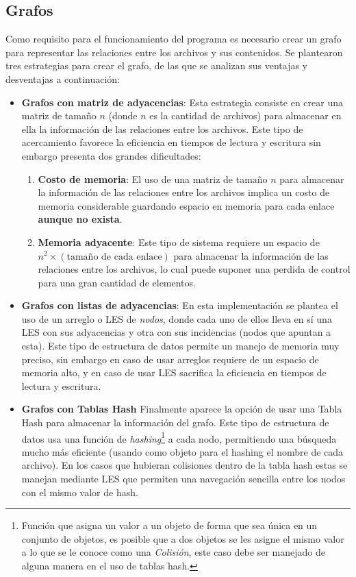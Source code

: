 \subsection{Grafos}
Como requisito para el funcionamiento del programa es necesario crear un grafo para representar las relaciones entre los archivos y sus contenidos. Se plantearon tres estrategias para crear el grafo, de las que se analizan sus ventajas y desventajas a continuación:
\begin{itemize}
    \item \textbf{Grafos con matriz de adyacencias}: Esta estrategia consiste en crear una matriz de tamaño $n$ (donde $n$ es la cantidad de archivos) para almacenar en ella la información de las relaciones entre los archivos.
    Este tipo de acercamiento favorece la eficiencia en tiempos de lectura y escritura sin embargo presenta dos grandes dificultades:
    \begin{enumerate}
        \item \textbf{Costo de memoria}: El uso de una matriz de tamaño $n$ para almacenar la información de las relaciones entre los archivos implica un costo de memoria considerable guardando espacio en memoria para cada enlace \textbf{aunque no exista}.
        \item \textbf{Memoria adyacente}: Este tipo de sistema requiere un espacio de $n^2\times(\text{tamaño de cada enlace})$ para almacenar la información de las relaciones entre los archivos, lo cual puede suponer una perdida de control para una gran cantidad de elementos.
    \end{enumerate}
    \item \textbf{Grafos con listas de adyacencias}: En esta implementación se plantea el uso de un arreglo o LES de \textit{nodos}, donde cada uno de ellos lleva en sí una LES con sus adyacencias y otra con sus incidencias (nodos que apuntan a esta). Este tipo de estructura de datos permite un manejo de memoria muy preciso, sin embargo en caso de usar arreglos requiere de un espacio de memoria alto, y en caso de usar LES sacrifica la eficiencia en tiempos de lectura y escritura.
    \item \textbf{Grafos con Tablas Hash} Finalmente aparece la opción de usar una Tabla Hash para almacenar la información del grafo. Este tipo de estructura de datos usa una función de \textit{hashing}\footnote{Función que asigna un valor a un objeto de forma que sea única en un conjunto de objetos, es posible que a dos objetos se les asigne el mismo valor a lo que se le conoce como una \textit{Colisión}, este caso debe ser manejado de alguna manera en el uso de tablas hash.} a cada nodo, permitiendo una búsqueda mucho más eficiente (usando como objeto para el hashing el nombre de cada archivo). En los casos que hubieran colisiones dentro de la tabla hash estas se manejan mediante LES que permiten una navegación sencilla entre los nodos con el mismo valor de hash.
\end{itemize}

